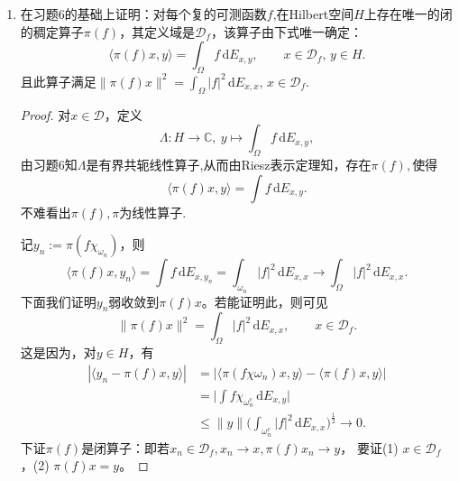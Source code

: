 \begin{enumerate}
\begin{proof}
\begin{align*}
    \sum_{i=1}^n |E_{x,y}(\Delta_i)| &=\sum |\langle E(\Delta_i)x,E(\Delta_i)y\rangle|\\
    &\leqslant \sum \|E(\Delta_i)x\| \cdot \|E(\Delta_i)y\|\\
    &\leqslant \Big(\sum \|E(\Delta_i)x\|^2\Big)^{\frac{1}{2}}\Big(\sum\|E(\Delta_i)y\|^2\Big)^\frac{1}{2}\\
    &\leqslant \|E(\omega)x\| \|y\|.
\end{align*}即证.

(iii)对$\omega$可测，
\begin{align*}
    \int \chi_\omega\,\mathrm{d}E_{x,w}&=E_{x,w}(\omega)= \langle E(\omega)x,w\rangle\\
    &= \langle E(\omega)x,\pi(f)z\rangle  = \langle \pi (\bar{f})E(\omega)x,z\rangle\\
    &= \langle \pi (f\chi_\omega)x,z\rangle  =\int \chi_\omega \bar{f}\,\mathrm{d}E_{x,z},
\end{align*}即证.
\end{proof}

\item[7]
在习题6的基础上证明：对每个复的可测函数$f$,在Hilbert空间$H$上存在唯一的闭的稠定算子$\pi(f)$，其定义域是$\mathcal{D}_f$，该算子由下式唯一确定：
\[\langle \pi(f)x,y\rangle  =\int_{\varOmega}f\,\mathrm{d}E_{x,y},\qquad x\in \mathcal{D}_f,\,y\in H.\]
且此算子满足$\|\pi(f)x\|^2=\int_{\Omega}|f|^2\,\mathrm{d}E_{x,x},\,x\in \mathcal{D}_f.$
\begin{proof}
对$x\in \mathcal{D}$，定义
\[\Lambda :H\rightarrow \mathbb{C},\ y \mapsto\int_\varOmega f\,\mathrm{d}E_{x,y},\]
由习题6知$\Lambda$是有界共轭线性算子,从而由Riesz表示定理知，存在$\pi(f),$使得
\[\langle \pi(f)x,y\rangle =\int f\,\mathrm{d}E_{x,y}.\]不难看出$\pi(f),\pi$为线性算子.

记$y_n:=\pi(f\chi_{\omega_n})$，则
\[\langle \pi(f)x,y_n\rangle =\int f\,\mathrm{d}E_{x,y_n}
= \int_{\omega_n} |f|^2\,\mathrm{d} E_{x,x} \rightarrow \int_{\varOmega} |f|^2\,\mathrm{d}E_{x,x}.\]
下面我们证明$y_n$弱收敛到$ \pi(f)x$。若能证明此，则可见
\[\|\pi(f)x\|^2=\int_{\varOmega}|f|^2\,\mathrm{d}E_{x,x},\qquad x\in \mathcal{D}_f.\]
这是因为，对$y\in H$，有
\begin{align*}|\langle y_n-\pi(f)x,y\rangle|
    &=|\langle \pi(f\chi\omega_n)x,y\rangle -\langle \pi (f)x,y\rangle|\\
    &= \bigg|\int f\chi_{\omega_n^c}\,\mathrm{d}E_{x,y}\bigg|\\
    &\leqslant \|y\| \bigg(\int_{\omega_n^c} |f|^2\,\mathrm{d}E_{x,x}\bigg)^\frac{1}{2}\rightarrow 0.
\end{align*}
下证$\pi(f)$是闭算子：即若$x_n\in \mathcal{D}_f,x_n\rightarrow x,\pi(f)x_n\rightarrow y$，
要证(1) $x\in \mathcal{D}_f$，(2) $\pi(f)x=y$。


\end{proof}
\end{enumerate}

